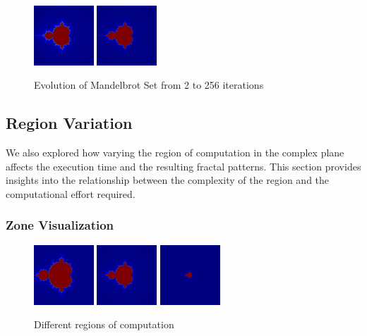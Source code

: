 \documentclass[11pt]{article}
\begin{document}
\begin{figure}[ht]
        \includegraphics[width=0.2\textwidth]{img/F_0128.png}
        \includegraphics[width=0.2\textwidth]{img/F_0256.png}
        \caption{Evolution of Mandelbrot Set from 2 to 256 iterations}
        \label{fig:mandelbrot}
    \end{figure}

\subsection{Region Variation}
We also explored how varying the region of computation in the complex plane affects the execution time and the resulting fractal patterns. This section provides insights into the relationship between the complexity of the region and the computational effort required.

\subsubsection{Zone Visualization}

\begin{figure}[ht]
    \centering
    \includegraphics[width=0.2\textwidth]{img/F_ones.png}
    \includegraphics[width=0.2\textwidth]{img/F_twos.png}
    \includegraphics[width=0.2\textwidth]{img/F_eights.png}
    \caption{Different regions of computation}
    \label{fig:mandelbrot}
\end{figure}
\end{document}
